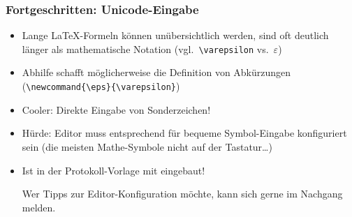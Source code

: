 \begin{frame}[<+->][fragile]
	\frametitle{Fortgeschritten: Unicode-Eingabe}
	\begin{itemize}
		\item Lange \LaTeX-Formeln können unübersichtlich werden, sind oft deutlich länger als mathematische Notation
		(vgl.\ \lstinline|\varepsilon| vs.\ $\varepsilon$)
		\item Abhilfe schafft möglicherweise die Definition von Abkürzungen (\lstinline|\newcommand{\eps}{\varepsilon}|)
		\item Cooler: Direkte Eingabe von Sonderzeichen!
		\renewcommand{\listingsfont}{\fontspec{FreeMono}}
		\lstset{numbers=left, frame=L}
		
		\item Hürde: Editor muss entsprechend für bequeme Symbol-Eingabe konfiguriert sein (die meisten Mathe-Symbole %
		nicht auf der Tastatur\dots)
		\item Ist in der Protokoll-Vorlage mit eingebaut!
		
		Wer Tipps zur Editor-Konfiguration möchte, kann sich gerne im Nachgang melden. 
	\end{itemize}
\end{frame}

